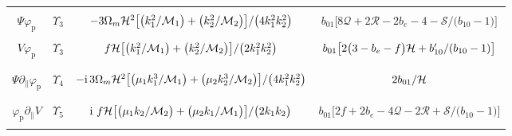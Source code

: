 \begin{sidewaystable}[!ph]
\begin{tabular}{| c | c | c | c |}
&  &  & \\
$\Psi {\varphi_{\mathrm{p}}}$ & ${\Upsilon_{{3}}}$ & $-3\Omega_m \mathcal{H}^{2}\big[\big(k_{1}^{2}/\mathcal{M}_{1}\big)+\big(k_{2}^{2}/\mathcal{M}_{2}\big)\big]/{\big(4k_{1}^{2}k_{2}^{2}\big)}$ & 
${ b_{01}\big[8\mathcal{Q}+2\mathcal{R} -2b_{e}-4 -\mathcal{S}/\big(b_{10}-1\big)\big]}$ \\ 
&  &  & \\
$V{\varphi_{\mathrm{p}}}$ & ${\Upsilon_{{3}}}$ & $f\mathcal{H}\big[\big(k_{1}^{2}/\mathcal{M}_{1}\big)+\big(k_{2}^{2}/\mathcal{M}_{2}\big)\big]/{\big(2k_{1}^{2}k_{2}^{2}\big)}$ & ${b_{01}\big[ 2\big(3-b_e-f\big)\mathcal{H}+b_{10}'/(b_{10}-1) \big]}$ \\ 
&  &  & \\
\hline 
&  &  & \\
$\Psi \partial_{\parallel}{\varphi_{\mathrm{p}}}$& ${\Upsilon_{{4}}}$ & $-\mathrm{i}\,3\Omega_m \mathcal{H}^{2}\big[\big(\mu_1 k_{1}^{3}/\mathcal{M}_{1}\big)+\big(\mu_2 k_{2}^{3}/\mathcal{M}_{2}\big)\big]/{\big(4k_{1}^{2}k_{2}^{2}\big)}$ & ${2}b_{01}/{\mathcal{H}}$ \\
&  &  & \\
\hline 
&  &  & \\
${\varphi_{\mathrm{p}}}\partial_{\parallel} V$ & ${\Upsilon_{{5}}}$ & $\mathrm{i\,}\,f\mathcal{H}\big[\big(\mu_1 k_{2}/\mathcal{M}_{2}\big)+\big(\mu_2 k_{1}/\mathcal{M}_{1}\big)\big]/{\big(2k_{1}k_{2}\big)}$ & 
${ b_{01}\big[2f+2b_e-4\mathcal{Q}-2\mathcal{R} +\mathcal{S}/\big(b_{10}-1\big)\big]}$ \\
&  &  & \\
\hline
\end{tabular}
\end{sidewaystable}
